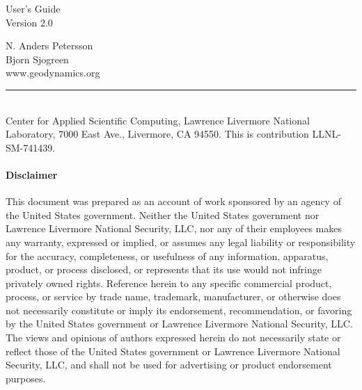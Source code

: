 \documentclass[11pt]{report}
\begin{document}
{%
\color{dark_grey}
\hfill{\Huge \fontfamily{\sfdefault}\selectfont User's Guide \\
\raggedleft \huge \fontfamily{\sfdefault}\selectfont Version 2.0\\}

\null
\vspace{.1in}
\color{dark_grey}
\Large \hfill {\raggedleft \fontfamily{\sfdefault}\selectfont
N. Anders Petersson\\
Bjorn Sjogreen\\
}
{\fontfamily{\sfdefault}\selectfont www.geodynamics.org}


\null
\color{dark_grey} \hspace{-6mm}\rule{\textwidth}{2pt}\\ 
{\small
  \fontfamily{\sfdefault}\selectfont Center for Applied Scientific
  Computing, Lawrence Livermore National Laboratory, 7000 East Ave., Livermore, CA 94550. This is
  contribution LLNL-SM-741439.
}  
}



\pagebreak
{}
\paragraph {Disclaimer} 
This document was prepared as an account of work sponsored by an agency of the United States
government. Neither the United States government nor Lawrence Livermore National Security, LLC, nor
any of their employees makes any warranty, expressed or implied, or assumes any legal liability or
responsibility for the accuracy, completeness, or usefulness of any information, apparatus, product,
or process disclosed, or represents that its use would not infringe privately owned
rights. Reference herein to any specific commercial product, process, or service by trade name,
trademark, manufacturer, or otherwise does not necessarily constitute or imply its endorsement,
recommendation, or favoring by the United States government or Lawrence Livermore National Security,
LLC. The views and opinions of authors expressed herein do not necessarily state or reflect those of
the United States government or Lawrence Livermore National Security, LLC, and shall not be used for
advertising or product endorsement purposes. 
\end{document}
